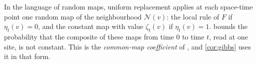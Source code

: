 In the language of random maps, uniform replacement applies at each space-time point one random map of the neighbourhood $\mathcal N(v)$: the local rule of $F$ if $\eta_t(v)=0$, and the constant map with value $\zeta_t(v)$ if $\eta_t(v)=1$.  bounds the probability that the composite of these maps from time $0$ to time $t$, read at one site, is not constant. This is the \emph{common-map coefficient} of \cite[eq.~(4)]{DM26}, and \cref{cor:gibbs} uses it in that form.

